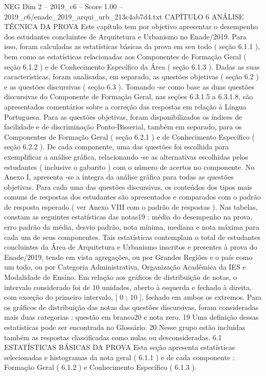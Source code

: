 \begin{textsample}{NEG Dim 2 – 2019\_c6 – Score 1.00 – 2019\_c6/enade\_2019\_arqui\_urb\_213c4ab7d4.txt}  \label{ex:f2_neg_276}
CAPÍTULO 6 ANÁLISE TÉCNICA DA PROVA Este capítulo tem por objetivo apresentar o desempenho dos estudantes concluintes de Arquitetura e Urbanismo no Enade/2019.
Para isso, foram calculadas as estatísticas básicas da prova em seu todo ( seção 6.1.1 ), bem como as estatísticas relacionadas aos Componentes de Formação Geral ( seção 6.1.2 ) e de Conhecimento Específico da Área ( seção 6.1.3 ).
Dadas as suas características, foram analisadas, em separado, as questões objetivas ( seção 6.2 ) e as questões discursivas ( seção 6.3 ).
Tomando -se como base as duas questões discursivas do Componente de Formação Geral, nas seções 6.3.1.5 a 6.3.1.8, são apresentados comentários sobre a correção das respostas em relação à Língua Portuguesa.
Para as questões objetivas, foram disponibilizados os índices de facilidade e de discriminação Ponto-Bisserial, também em separado, para os Componentes de Formação Geral ( seção 6.2.1 ) e de Conhecimento Específico ( seção 6.2.2 ).
De cada componente, uma das questões foi escolhida para exemplificar a análise gráfica, relacionando -se as alternativas escolhidas pelos estudantes ( inclusive o gabarito ) com o número de acertos no componente.
No Anexo I, apresenta -se a íntegra da análise gráfica para todas as questões objetivas.
Para cada uma das questões discursivas, os conteúdos dos tipos mais comuns de respostas dos estudantes são apresentados e comparados com o padrão de resposta esperado ( ver Anexo VIII com o padrão de respostas ).
Nas tabelas, constam as seguintes estatísticas das notas19 : média do desempenho na prova, erro padrão da média, desvio padrão, nota mínima, mediana e nota máxima para cada um de seus componentes.
Tais estatísticas contemplam o total de estudantes concluintes da Área de Arquitetura e Urbanismo inscritos e presentes à prova do Enade/2019, tendo em vista agregações, ou por Grandes Regiões e o país como um todo, ou por Categoria Administrativa, Organização Acadêmica da IES e Modalidade de Ensino.
Em relação aos gráficos de distribuição de notas, o intervalo considerado foi de 10 unidades, aberto à esquerda e fechado à direita, com exceção do primeiro intervalo, [ 0 ; 10 ], fechado em ambos os extremos.
Para os gráficos de distribuição das notas das questões discursivas, foram consideradas mais duas categorias : questão em branco20 e nota zero. 19 Uma definição dessas estatísticas pode ser encontrada no Glossário. 20 Nesse grupo estão incluídas também as respostas classificadas como nulas ou desconsideradas. 6.1 ESTATÍSTICAS BÁSICAS DA PROVA Esta seção apresenta estatísticas selecionadas e histogramas da nota geral ( 6.1.1 ) e de cada componente : Formação Geral ( 6.1.2 ) e Conhecimento Específico ( 6.1.3 ).

\end{textsample}

